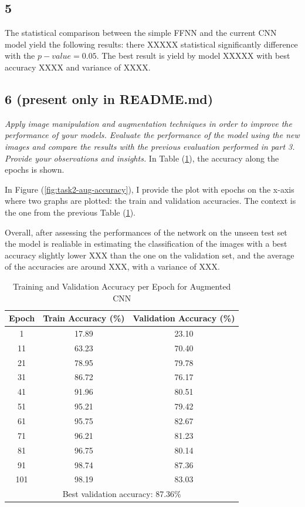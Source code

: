 \documentclass[11pt]{scrartcl}
\begin{document}
\subsection*{5}

The statistical comparison between the simple FFNN and the current CNN model yield 
the following results:
there XXXXX statistical significantly difference with the \( p-value = 0.05 \).
The best result is yield by model XXXXX with best accuracy XXXX and variance of XXXX.

\subsection*{6 (present only in README.md)}
\textit{
Apply image manipulation and augmentation techniques in order to improve the performance of your models. 
Evaluate the performance of the model using the new images 
and compare the results with the previous evaluation performed in part 3. 
Provide your observations and insights.
}
In Table (\ref{tab:task2-aug-accuracy}),
the accuracy along the epochs is shown.

In Figure (\ref{fig:task2-aug-accuracy}), 
I provide the plot with epochs on the x-axis where two graphs are plotted:
the train and validation accuracies.
The context is the one from the previous Table (\ref{tab:task2-aug-accuracy}). 

Overall, after assessing the performances of the network on the unseen test set
the model is realiable in estimating the classification of the images with
a best accuracy slightly lower XXX than the one on the validation set,
and the average of the accuracies are around XXX,
with a variance of XXX.

\begin{table}[htbp]
\centering
\caption{Training and Validation Accuracy per Epoch for Augmented CNN}
\begin{tabular}{ccc}
\toprule
\textbf{Epoch} & \textbf{Train Accuracy (\%)} & \textbf{Validation Accuracy (\%)} \\
\midrule
1    & 17.89 & 23.10 \\
11   & 63.23 & 70.40 \\
21   & 78.95 & 79.78 \\
31   & 86.72 & 76.17 \\
41   & 91.96 & 80.51 \\
51   & 95.21 & 79.42 \\
61   & 95.75 & 82.67 \\
71   & 96.21 & 81.23 \\
81   & 96.75 & 80.14 \\
91   & 98.74 & 87.36 \\
101  & 98.19 & 83.03 \\
\midrule
\multicolumn{3}{c}{Best validation accuracy: 87.36\%} \\
\bottomrule
\end{tabular}
\label{tab:task2-aug-accuracy}
\end{table}
\end{document}
